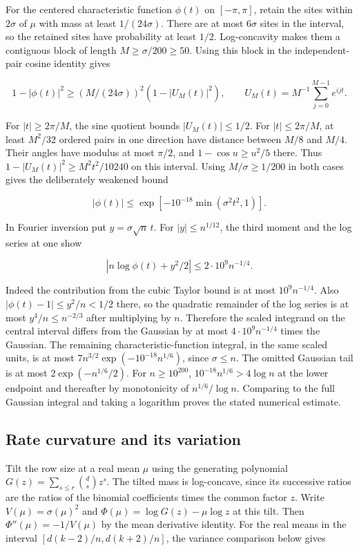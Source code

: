 \documentclass[11pt]{article}
\begin{document}
For the centered characteristic function $\phi(t)$ on $[-\pi,\pi]$,
retain the sites within $2\sigma$ of $\mu$ with mass at least
$1/(24\sigma)$. There are at most $6\sigma$ sites in the interval, so
the retained sites have probability at least $1/2$. Log-concavity
makes them a contiguous block of length $M\ge\sigma/200\ge50$.
Using this block in the independent-pair cosine identity gives

\[
1-|\phi(t)|^2\ge (M/(24\sigma))^2(1-|U_M(t)|^2),
\qquad
U_M(t)=M^{-1}\sum_{j=0}^{M-1} e^{ijt}.
\]

For $|t|\ge2\pi/M$, the sine quotient bounds $|U_M(t)|\le1/2$.
For $|t|\le2\pi/M$, at least $M^2/32$ ordered pairs in one direction
have distance between $M/8$ and $M/4$. Their angles have modulus
at most $\pi/2$, and $1-\cos u\ge u^2/5$ there. Thus
$1-|U_M(t)|^2\ge M^2t^2/10240$ on this interval.
Using $M/\sigma\ge1/200$ in both cases gives the deliberately weakened bound

\[
|\phi(t)|\le \exp[-10^{-18}\min(\sigma^2t^2,1)].
\]

In Fourier inversion put $y=\sigma\sqrt n\,t$. For
$|y|\le n^{1/12}$, the third moment and the log series at one show

\[
|n\log\phi(t)+y^2/2|\le 2\cdot10^9 n^{-1/4}.
\]

Indeed the contribution from the cubic Taylor bound is at most
$10^9 n^{-1/4}$. Also $|\phi(t)-1|\le y^2/n<1/2$ there, so the
quadratic remainder of the log series is at most $y^4/n\le n^{-2/3}$
after multiplying by $n$. Therefore the scaled integrand on the central
interval differs from the Gaussian by at most $4\cdot10^9 n^{-1/4}$
times the Gaussian. The remaining characteristic-function integral,
in the same scaled units, is at most
$7n^{3/2}\exp(-10^{-18}n^{1/6})$, since $\sigma\le n$.
The omitted Gaussian tail is at most $2\exp(-n^{1/6}/2)$.
For $n\ge10^{200}$, $10^{-18}n^{1/6}>4\log n$ at the lower endpoint
and thereafter by monotonicity of $n^{1/6}/\log n$.
Comparing to the full Gaussian integral and taking a logarithm proves
the stated numerical estimate.

\subsection{Rate curvature and its variation}

Tilt the row size at a real mean $\mu$ using the generating polynomial
$G(z)=\sum_{s\le r}\binom ds z^s$. The tilted mass is log-concave,
since its successive ratios are the ratios of the binomial coefficients
times the common factor $z$. Write $V(\mu)=\sigma(\mu)^2$ and
$\Phi(\mu)=\log G(z)-\mu\log z$ at this tilt. Then
$\Phi''(\mu)=-1/V(\mu)$ by the mean derivative identity.
For the real means in the interval $[d(k-2)/n,d(k+2)/n]$, the
variance comparison below
gives
\end{document}
